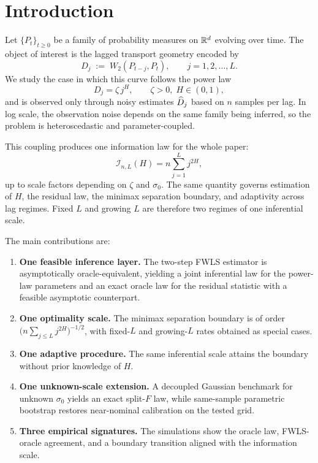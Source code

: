 \section{Introduction}
\label{sec:intro}

Let $\{P_t\}_{t \geq 0}$ be a family of probability measures on $\mathbb{R}^d$
evolving over time. The object of interest is the lagged transport geometry
encoded by
\[
    D_j \;:=\; W_2(P_{t-j}, P_t),\qquad j = 1, 2, \ldots, L.
\]
We study the case in which this curve follows the power law
\begin{equation}
    D_j = \zeta\,j^H,\qquad \zeta > 0,\; H \in (0,1),
    \label{eq:power-law}
\end{equation}
and is observed only through noisy estimates $\widehat{D}_j$ based on $n$ samples per
lag. In log scale, the observation noise depends on the same family being
inferred, so the problem is heteroscedastic and parameter-coupled.

This coupling produces one information law for the whole paper:
\[
    \mathcal I_{n,L}(H) = n \sum_{j=1}^L j^{2H},
\]
up to scale factors depending on $\zeta$ and $\sigma_0$. The same quantity
governs estimation of $H$, the residual law, the minimax separation
boundary, and adaptivity across lag regimes. Fixed $L$ and growing $L$ are
therefore two regimes of one inferential scale.

The main contributions are:
\begin{enumerate}[leftmargin=*,label=(\arabic*)]
\item \textbf{One feasible inference layer.} The two-step FWLS estimator is
asymptotically oracle-equivalent, yielding a joint inferential law for the
power-law parameters and an exact oracle law for the residual statistic with a
feasible asymptotic counterpart.

\item \textbf{One optimality scale.} The minimax separation boundary is of
order $\bigl(n\sum_{j \leq L} j^{2H}\bigr)^{-1/2}$, with fixed-$L$ and
growing-$L$ rates obtained as special cases.

\item \textbf{One adaptive procedure.} The same inferential scale attains the
boundary without prior knowledge of $H$.

\item \textbf{One unknown-scale extension.} A decoupled Gaussian benchmark for
unknown $\sigma_0$ yields an exact split-$F$ law, while same-sample parametric
bootstrap restores near-nominal calibration on the tested grid.

\item \textbf{Three empirical signatures.} The simulations show the oracle law,
FWLS-oracle agreement, and a boundary transition aligned with the information
scale.
\end{enumerate}

